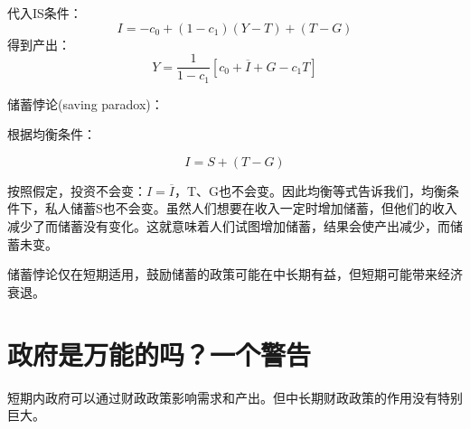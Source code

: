 \documentclass{article}
\begin{document}
代入IS条件：
\[
I=-c_0+(1-c_1)(Y-T)+(T-G)
\]
得到产出：
\[
Y=\frac{1}{1-c_1}[c_0+\overline{I}+G-c_1T]
\]

\hspace*{\fill}

储蓄悖论(saving paradox)：

根据均衡条件：

\[
I=S+(T-G)
\]

按照假定，投资不会变：$ I=\overline{I} $，T、G也不会变。因此均衡等式告诉我们，均衡条件下，私人储蓄S也不会变。虽然人们想要在收入一定时增加储蓄，但他们的收入减少了而储蓄没有变化。这就意味着人们试图增加储蓄，结果会使产出减少，而储蓄未变。

储蓄悖论仅在短期适用，鼓励储蓄的政策可能在中长期有益，但短期可能带来经济衰退。


\section{政府是万能的吗？一个警告}
短期内政府可以通过财政政策影响需求和产出。但中长期财政政策的作用没有特别巨大。
\end{document}
